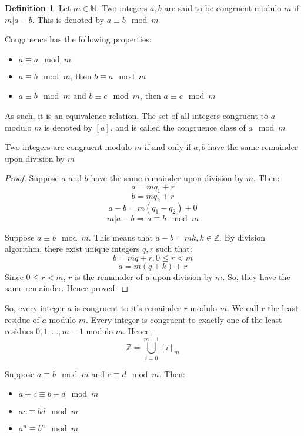 \documentclass[12pt,letterpaper]{book}
\theoremstyle{definition}
\newtheorem{definition}{Definition} %
\newcommand{\N}{\mathbb{N}}
\newcommand{\Z}{\mathbb{Z}}
\begin{document}
\begin{definition}
  Let $m \in \N$. Two integers $a,b$ are said to be congruent modulo $m$ if $m|a-b$. This is denoted by $a \equiv b \mod m$
\end{definition}

Congruence has the following properties:

\begin{itemize}
  \item $a \equiv a \mod m$
  \item $a \equiv b \mod m$, then $b \equiv a \mod m$
  \item $a \equiv b \mod m$ and $b \equiv c \mod m$, then $a \equiv c \mod m$
\end{itemize}

As such, it is an equivalence relation. The set of all integers congruent to $a$ modulo $m$ is denoted by $[a]$, and is called the congruence class of $a \mod m$

\begin{lemma}
  Two integers are congruent modulo $m$ if and only if $a,b$ have the same remainder upon division by $m$
\end{lemma}
\begin{proof}
Suppose $a$ and $b$ have the same remainder upon division by $m$. Then:
\[a = mq_1 + r\]
\[b = mq_2 + r\]
\[a-b = m(q_1-q_2) + 0\]
\[m|a-b \Rightarrow a \equiv b \mod m\]

Suppose $a \equiv b \mod m$. This means that $a-b = mk, k \in \Z$. By division algorithm, there exist unique integers $q,r$ such that:
\[b = mq+r, 0 \leq r < m\]
\[a = m(q+k) + r\]
Since $0 \leq r < m$, $r$ is the remainder of $a$ upon division by $m$. So, they have the same remainder. Hence proved.
\end{proof}

So, every integer $a$ is congruent to it's remainder $r$ modulo $m$. We call $r$ the least residue of $a$ modulo $m$. Every integer is congruent to exactly one of the least residues $0,1,...,m-1$ modulo $m$. Hence,
\[\Z = \bigcup_{i=0}^{m-1} [i]_m\]

\begin{lemma}
  Suppose $a \equiv b \mod m$ and $c \equiv d \mod m$. Then:
  \begin{itemize}
    \item $a \pm c \equiv b \pm d \mod m$
    \item $ac \equiv bd \mod m$
    \item $a^n \equiv b^n \mod m$
  \end{itemize}
\end{lemma}
\end{document}
